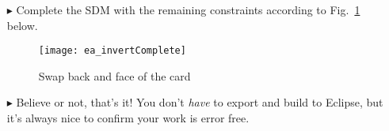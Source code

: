 \begin{itemize}
\vspace*{0.5cm}

\item[$\blacktriangleright$] Complete the SDM with the remaining constraints according to Fig.~\ref{ea:sdm_invertComplete} below.

\vspace{0.5cm}

\begin{figure}[htbp]
\begin{center}
  \texttt{[image: ea\_invertComplete]}
  \caption{Swap back and face of the card}  
  \label{ea:sdm_invertComplete}
\end{center}
\end{figure}

\vspace{0.5cm}

\item[$\blacktriangleright$] Believe or not, that's it! You don't \emph{have} to export and build to Eclipse, but it's always nice to confirm your work is error
free.

\end{itemize}

